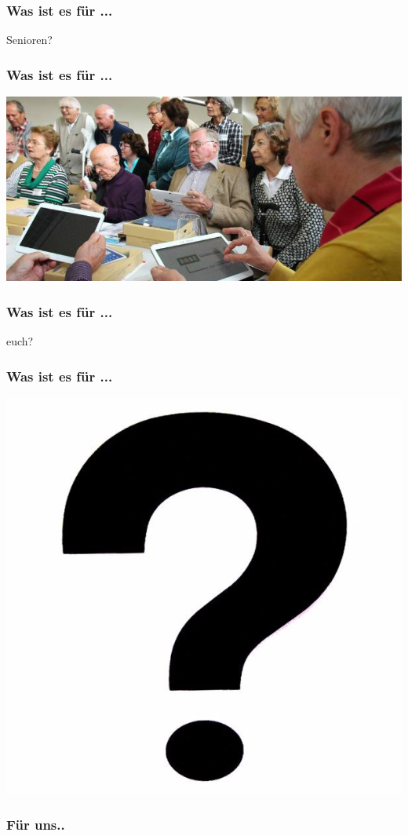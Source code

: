 \documentclass[12pt]{beamer}
\begin{document}
\begin{center}
\begin{frame}
	\frametitle{Was ist es für ...}
	Senioren?
\end{frame}
\begin{frame}
	\frametitle{Was ist es für ...}
	\includegraphics[height=0.5\textheight]{img//senior.jpg}
\end{frame}
\begin{frame}
	\frametitle{Was ist es für ...}
	 euch?
\end{frame}
\begin{frame}
	\frametitle{Was ist es für ...}
	\includegraphics[height=0.4\textheight]{img//frage.jpg}
\end{frame}
\begin{frame}
	\frametitle{Für uns..}
\end{frame}
\end{center}
\end{document}
